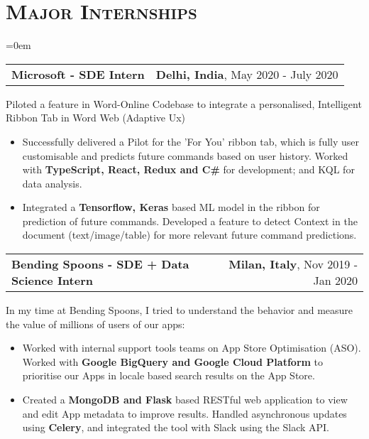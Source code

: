 \documentclass{article}
\makeatletter
\newcommand{\headerrow}[2]
{\begin{tabular*}{\linewidth}{l@{\extracolsep{\fill}}r}
	#1 &
	#2 \\
\end{tabular*}}
\newcommand{\tmpsection}[1]{}
\let\tmpsection=\section
\renewcommand{\section}[1]{\tmpsection*{\textsc{#1}}}
\makeatother
\begin{document}
\section{Major Internships}
\begin{list} {}{\leftmargin=0em}
\setlength{\leftmargin}{0pt}

    \item[]
    \headerrow {\textbf{Microsoft - SDE Intern} }{\textbf{Delhi, India},  May 2020 - July 2020}
    Piloted a feature in Word-Online Codebase to integrate a personalised, Intelligent Ribbon Tab in Word Web (Adaptive Ux)
    \begin{itemize}
    \setlength\itemsep{0.0em}
        \item Successfully delivered a Pilot for the 'For You' ribbon tab, which is fully user customisable and predicts future commands based on user history. Worked with \textbf{TypeScript, React, Redux and C\#} for development; and KQL for data analysis.
        \item Integrated a \textbf{Tensorflow, Keras} based ML model in the ribbon for prediction of future commands. Developed a feature to detect Context in the document (text/image/table) for more relevant future command predictions.
    \end{itemize}
    
     \item[]
    \headerrow {\textbf{Bending Spoons - SDE + Data Science Intern}}{\textbf{Milan, Italy},  Nov 2019 - Jan 2020}
    In my time at Bending Spoons, I tried to understand the behavior and measure the value of millions of users of our apps:
    \begin{itemize}
    \setlength\itemsep{0.0em}
        \item Worked with internal support tools teams on App Store Optimisation (ASO). Worked with \textbf{Google BigQuery and Google Cloud Platform} to prioritise our Apps in locale based search results on the App Store.
        \item Created a \textbf{MongoDB and Flask} based RESTful web application to view and edit App metadata to improve results. Handled asynchronous updates using \textbf{Celery}, and integrated the tool with Slack using the Slack API.
    \end{itemize}
    

\end{list}
\end{document}
